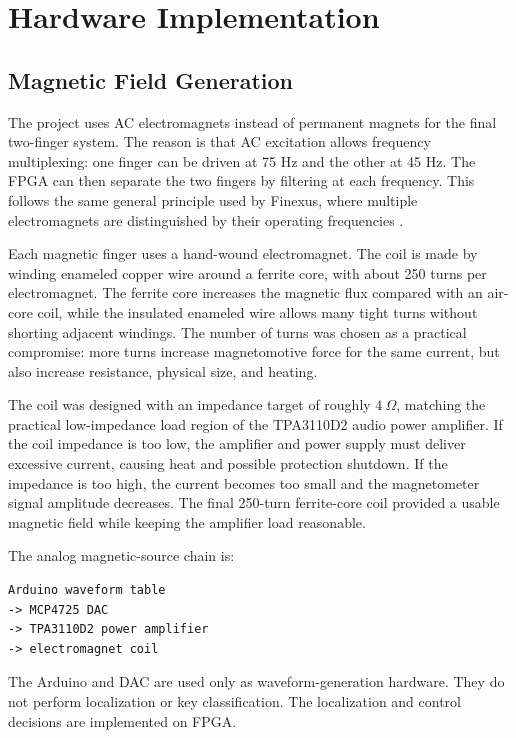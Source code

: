 \section{Hardware Implementation}
\label{sec:hardware_implementation}

\subsection{Magnetic Field Generation}

The project uses AC electromagnets instead of permanent magnets for the final two-finger system. The reason is that AC excitation allows frequency multiplexing: one finger can be driven at 75 Hz and the other at 45 Hz. The FPGA can then separate the two fingers by filtering at each frequency. This follows the same general principle used by Finexus, where multiple electromagnets are distinguished by their operating frequencies \cite{chen2016finexus}.

Each magnetic finger uses a hand-wound electromagnet. The coil is made by winding enameled copper wire around a ferrite core, with about 250 turns per electromagnet. The ferrite core increases the magnetic flux compared with an air-core coil, while the insulated enameled wire allows many tight turns without shorting adjacent windings. The number of turns was chosen as a practical compromise: more turns increase magnetomotive force for the same current, but also increase resistance, physical size, and heating.

The coil was designed with an impedance target of roughly $4~\Omega$, matching the practical low-impedance load region of the TPA3110D2 audio power amplifier. If the coil impedance is too low, the amplifier and power supply must deliver excessive current, causing heat and possible protection shutdown. If the impedance is too high, the current becomes too small and the magnetometer signal amplitude decreases. The final 250-turn ferrite-core coil provided a usable magnetic field while keeping the amplifier load reasonable.

The analog magnetic-source chain is:

\begin{lstlisting}
Arduino waveform table
-> MCP4725 DAC
-> TPA3110D2 power amplifier
-> electromagnet coil
\end{lstlisting}

The Arduino and DAC are used only as waveform-generation hardware. They do not perform localization or key classification. The localization and control decisions are implemented on FPGA.

